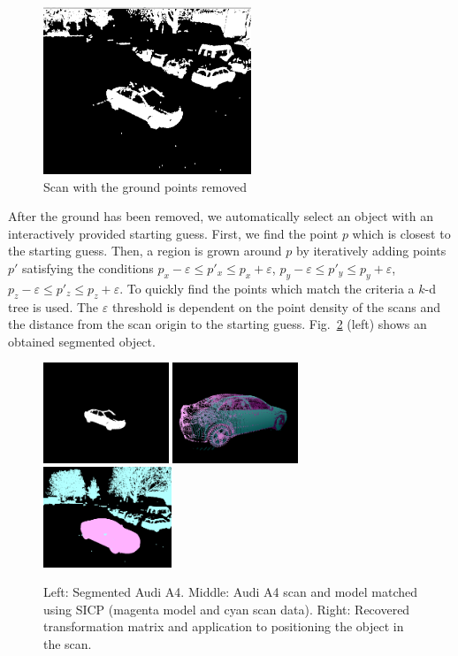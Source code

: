 \documentclass{llncs}
\renewcommand{\epsilon}{\varepsilon}
\begin{document}
  \begin{figure}
\centering
      \includegraphics[height=50mm]{ground-removed}
    \caption{Scan with the ground points removed}
    \label{groundremoved}
  \end{figure}

After the ground has been removed, we automatically select an object
with an interactively provided starting guess. First, we find the
point $p$ which is closest to the starting guess. Then, a region is
grown around $p$ by iteratively adding points $p'$ satisfying the
conditions $p_x - \epsilon \leq p'_x \leq p_x + \epsilon$, $p_y -
\epsilon \leq p'_y \leq p_y + \epsilon$, $p_z - \epsilon \leq p'_z
\leq p_z + \epsilon$. To quickly find the points which match the
criteria a $k$-d tree is used. The $\epsilon$ threshold is dependent
on the point density of the scans and the distance from the scan
origin to the starting guess. Fig.~\ref{segmented_object} (left)
shows an obtained segmented object.
	
\begin{figure}[Ht]
  \centering
  \includegraphics[height=30mm]{audi_segmented}
  \hfill
  \includegraphics[height=30mm]{step4}
  \hfill
  \includegraphics[height=30mm]{recovery_model_in_big_scan}
  \caption{Left: Segmented Audi A4. Middle: Audi A4 scan and model matched using SICP (magenta model and cyan scan data). Right: Recovered transformation matrix and application to positioning the object in the scan.}
  \label{segmented_object}
\end{figure}
\end{document}
